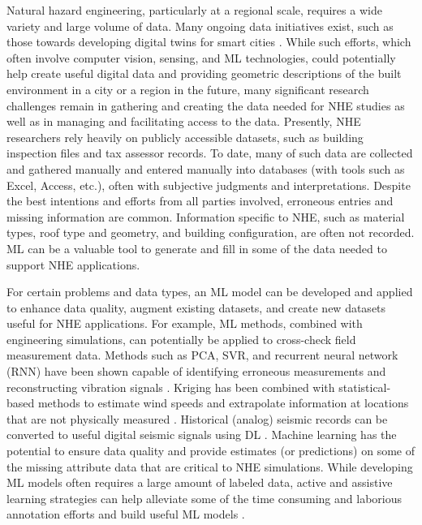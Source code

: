 Natural hazard engineering, particularly at a regional scale, requires a wide variety and large volume of data. Many ongoing data initiatives exist, such as those towards developing digital twins for smart cities \citep{nic2017, lehner2020digital, schrotter2020digital, day2019bentley}. While such efforts, which often involve computer vision, sensing, and ML technologies, could potentially help create useful digital data and providing geometric descriptions of the built environment in a city or a region in the future, many significant research challenges remain in gathering and creating the data needed for NHE studies as well as in managing and facilitating access to the data. Presently, NHE researchers rely heavily on publicly accessible datasets, such as building inspection files and tax assessor records. To date, many of such data are collected and gathered manually and entered manually into databases (with tools such as Excel, Access, etc.), often with subjective judgments and interpretations. Despite the best intentions and efforts from all parties involved, erroneous entries and missing information are common. Information specific to NHE, such as material types, roof type and geometry, and building configuration, are often not recorded. ML can be a valuable tool to generate and fill in some of the data needed to support NHE applications. 

For certain problems and data types, an ML model can be developed and applied to enhance data quality, augment existing datasets, and create new datasets useful for NHE applications. For example, ML methods, combined with engineering simulations, can potentially be applied to cross-check field measurement data. Methods such as PCA, SVR, and recurrent neural network (RNN) have been shown capable of identifying erroneous measurements and reconstructing vibration signals \citep{kerschen2005sensor, jeong2019sensor}. Kriging has been combined with statistical-based methods to estimate wind speeds and extrapolate information at locations that are not physically measured \citep{xu2014conditional}. Historical (analog) seismic records can be converted to useful digital seismic signals using DL \citep{wang2019seismology}. Machine learning has the potential to ensure data quality and provide estimates (or predictions) on some of the missing attribute data that are critical to NHE simulations. While developing ML models often requires a large amount of labeled data, active and assistive learning strategies can help alleviate some of the time consuming and laborious annotation efforts and build useful ML models \citep{joshi2009multiclass, wong2019assistive, yu2020largescale}. 

